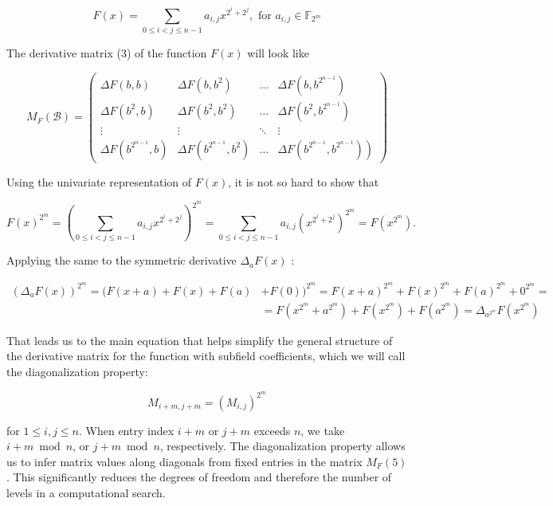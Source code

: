 \documentclass[10pt]{article}
\begin{document}
\begin{equation*}
F(x)=\sum_{0 \leq i<j \leq n-1} a_{i, j} x^{2^{i}+2^{j}}, \text { for } a_{i, j} \in \mathbb{F}_{2^{m}} \tag{4}
\end{equation*}


The derivative matrix (3) of the function $F(x)$ will look like

\[
M_{F}(\mathcal{B})=\left(\begin{array}{cccc}
\Delta F(b, b) & \Delta F\left(b, b^{2}\right) & \ldots & \Delta F\left(b, b^{2^{n-1}}\right)  \tag{5}\\
\Delta F\left(b^{2}, b\right) & \Delta F\left(b^{2}, b^{2}\right) & \ldots & \Delta F\left(b^{2}, b^{2^{n-1}}\right) \\
\vdots & \vdots & \ddots & \vdots \\
\Delta F\left(b^{2^{n-1}}, b\right) & \Delta F\left(b^{2^{n-1}}, b^{2}\right) & \ldots & \left.\Delta F\left(b^{2^{n-1}}, b^{2^{n-1}}\right)\right)
\end{array}\right)
\]

Using the univariate representation of $F(x)$, it is not so hard to show that

$$
F(x)^{2^{m}}=\left(\sum_{0 \leq i<j \leq n-1} a_{i, j} x^{2^{i}+2^{j}}\right)^{2^{m}}=\sum_{0 \leq i<j \leq n-1} a_{i, j}\left(x^{2^{i}+2^{j}}\right)^{2^{m}}=F\left(x^{2^{m}}\right) .
$$

Applying the same to the symmetric derivative $\Delta_{a} F(x)$ :

$$
\begin{aligned}
\left(\Delta_{a} F(x)\right)^{2^{m}}=(F(x+a)+F(x)+F(a) & +F(0))^{2^{m}}=F(x+a)^{2^{m}}+F(x)^{2^{m}}+F(a)^{2^{m}}+0^{2^{m}}= \\
& =F\left(x^{2^{m}}+a^{2^{m}}\right)+F\left(x^{2^{m}}\right)+F\left(a^{2^{m}}\right)=\Delta_{a^{2^{m}}} F\left(x^{2^{m}}\right)
\end{aligned}
$$

That leads us to the main equation that helps simplify the general structure of the derivative matrix for the function with subfield coefficients, which we will call the diagonalization property:


\begin{equation*}
M_{i+m, j+m}=\left(M_{i, j}\right)^{2^{m}} \tag{6}
\end{equation*}


for $1 \leq i, j \leq n$. When entry index $i+m$ or $j+m$ exceeds $n$, we take $i+m \bmod n$, or $j+m \bmod n$, respectively. The diagonalization property allows us to infer matrix values along diagonals from fixed entries in the matrix $M_{F}(5)$. This significantly reduces the degrees of freedom and therefore the number of levels in a computational search.
\end{document}
